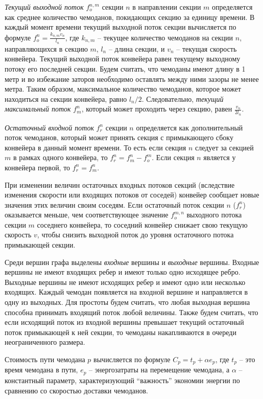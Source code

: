 \documentclass[specification, annotation]{itmo-student-thesis}
\begin{document}
\textit{Текущий выходной поток} $f_o^{n,m}$ секции $n$ в направлении секции
$m$ определяется как среднее количество чемоданов, покидающих секцию за единицу
времени. В каждый момент времени текущий выходной поток секции вычисляется по
формуле $f_o^n = \frac{k_{n,m} v_n}{l_n}$, где $k_{n,m}$ -- текущее количество чемоданов
на секции $n$, направляющихся в секцию $m$, $l_n$ -- длина секции, и $v_n$ --
текущая скорость конвейера. Текущий выходной поток конвейера равен текущему
выходному потоку его последней секции. Будем считать, что чемоданы имеют длину в
1 метр и во избежание заторов необходимо оставлять между ними зазоры не менее
метра. Таким образом, максимальное количество чемоданов, которое может
находиться на секции конвейера, равно $l_n/2$. Следовательно, \textit{текущий максимальный поток} $f_m^n$, который может
проходить через секцию, равен $\frac{v_n}{2l_n}$.

\textit{Остаточный входной поток} $f_r^n$ секции $n$ определяется как дополнительный поток
чемоданов, который может принять секция с примыкающего сбоку конвейера в данный момент
времени. То есть если секция $n$ следует за секцией $m$ в рамках одного
конвейера, то $f_r^n = f_m^n - f_o^m$. Если секция $n$ является у конвейера
первой, то $f_r^n = f_m^n$.

При изменении величин остаточных входных потоков секций (вследствие изменения
скорости или входящих потоков от соседей) конвейер сообщает новые значения этих
величин своим соседям. Если остаточный поток секции $n$ ($f_r^n$) оказывается меньше, чем
соответствующее значение $f_o^{m,n}$ выходного потока секции $m$ соседнего конвейера, то
соседний конвейер снижает свою текущую скорость $v$, чтобы снизить выходной
поток до уровня остаточного потока примыкающей секции.

Среди вершин графа выделены \textit{входные} вершины и \textit{выходные}
вершины. Входные вершины не имеют входящих ребер и имеют только одно исходящее
ребро. Выходные вершины не имеют исходящих ребер и имеют одно или несколько
входящих. Каждый чемодан появляется на входной вершине и направляется в одну из
выходных. Для простоты будем считать, что любая выходная вершина способна
принимать входящий поток любой величины. Также будем считать, что если исходящий
поток из входной вершины превышает текущий остаточный поток примыкающей к ней
секции, то чемоданы накапливаются в очереди неограниченного размера.

Стоимость пути чемодана $p$ вычисляется по формуле $C_p = t_p + \alpha e_p$, где
$t_p$ -- это время чемодана в пути, $e_p$ -- энергозатраты на перемещение чемодана,
а $\alpha$ -- константный параметр, характеризующий \enquote{важность} экономии
энергии по сравнению со скоростью доставки чемоданов.
\end{document}
